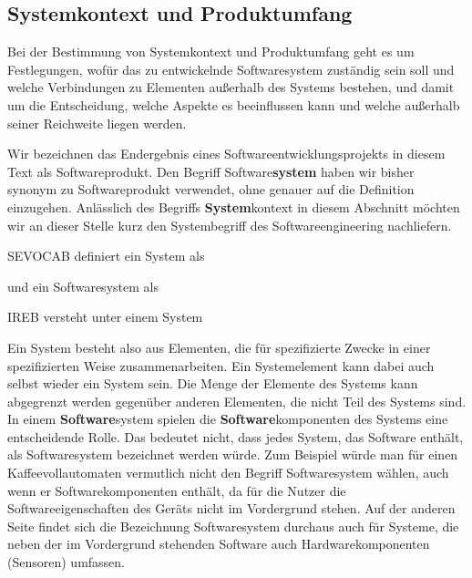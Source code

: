 \subsection{Systemkontext und Produktumfang}
\label{sec:Kap-6.1.3}

Bei der Bestimmung von Systemkontext und Produktumfang geht es um Fest\-legungen, wofür das zu entwickelnde Softwaresystem zuständig sein soll und welche Verbindungen zu Elementen außerhalb des Systems bestehen, und damit um die Entscheidung, welche Aspekte es beeinflussen kann und welche außerhalb seiner Reichweite liegen werden.

Wir bezeichnen das Endergebnis eines Softwareentwicklungsprojekts in diesem Text als Softwareprodukt. Den Begriff Software\textbf{system} haben wir bisher synonym zu Softwareprodukt verwendet, ohne genauer auf die Definition einzugehen. Anlässlich des Begriffs \textbf{System}kontext in diesem Abschnitt möchten wir an dieser Stelle kurz den Systembegriff des Softwareengineering nachliefern.


SEVOCAB definiert ein System als 


und ein Softwaresystem als 


IREB versteht unter einem System 


\pagebreak %

Ein System besteht also aus Elementen, die für spezifizierte Zwecke in einer spezifizierten Weise zusammenarbeiten. Ein Systemelement kann dabei auch selbst wieder ein System sein. Die Menge der Elemente des Systems kann abgegrenzt werden gegenüber anderen Elementen, die nicht Teil des Systems sind. In einem \textbf{Software}\-system spielen die \textbf{Software}komponenten des Systems eine entscheidende Rolle. Das bedeutet nicht, dass jedes System, das Software enthält, als Softwaresystem bezeichnet werden würde. Zum Beispiel würde man für einen Kaffeevollautomaten vermutlich nicht den Begriff Softwaresystem wählen, auch wenn er Software\-komponenten enthält, da für die Nutzer die Softwareeigenschaften des Geräts nicht im Vordergrund stehen. Auf der anderen Seite findet sich die Bezeichnung Softwaresystem durchaus auch für Systeme, die neben der im Vordergrund stehenden Software auch Hardwarekomponenten (\zb Sensoren) umfassen. 

